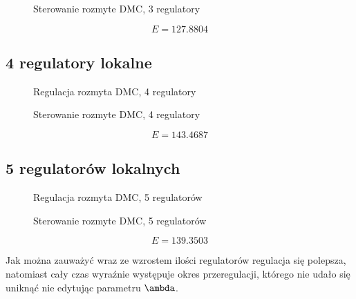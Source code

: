 \begin{figure}[H]
\centering

\caption{Sterowanie rozmyte DMC, 3 regulatory}
\end{figure}

\begin{equation}
    E = \num{127,8804}
\end{equation}

\subsection{4 regulatory lokalne}

\begin{figure}[H]
\centering

\caption{Regulacja rozmyta DMC, 4 regulatory}
\end{figure}

\begin{figure}[H]
\centering

\caption{Sterowanie rozmyte DMC, 4 regulatory}
\end{figure}

\begin{equation}
    E = \num{143,4687}
\end{equation}

\subsection{5 regulatorów lokalnych}

\begin{figure}[H]
\centering

\caption{Regulacja rozmyta DMC, 5 regulatorów}
\end{figure}

\begin{figure}[H]
\centering

\caption{Sterowanie rozmyte DMC, 5 regulatorów}
\end{figure}

\begin{equation}
    E = \num{139,3503}
\end{equation}

Jak można zauważyć wraz ze wzrostem ilości regulatorów regulacja się polepsza, natomiast cały czas wyraźnie występuje okres przeregulacji, którego nie udało się uniknąć nie edytując parametru $\ambda$.

